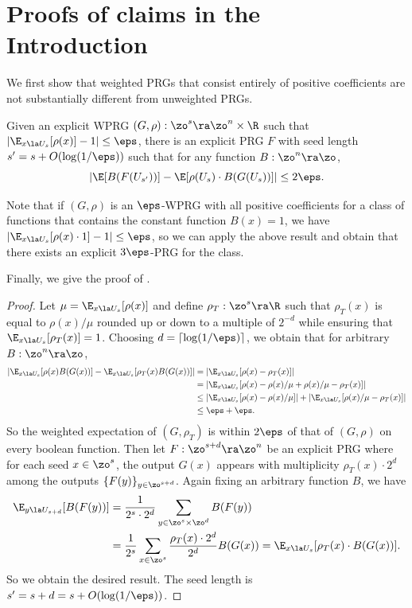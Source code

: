 \documentclass{toc}
\begin{document}
\section{Proofs of claims in the Introduction}\label{app:intro} %
We first show that weighted PRGs that consist entirely of positive coefficients are not substantially different %
from
%
unweighted PRGs.
\begin{proposition}\label{app:prop:unweight}
    Given an explicit WPRG $(G,\rho):\zo^s\ra\zo^n\times \R$
    such that $|\E_{x\la U_s}[\rho(x)]-1|\leq  \eps$, there is an explicit PRG $F$ with seed length $s'=s+O(\log(1/\eps))$ such that for any function $B:\zo^n\ra\zo$, \[|\E[B(F(U_{s'}))] - \E[\rho(U_s)\cdot B(G(U_s))] |\leq 2\eps.\]
\end{proposition}
Note that if $(G,\rho)$ is an $\eps$-WPRG with all positive coefficients for a class of functions that contains the constant function $B(x)=1$, we have $|\E_{x\la U_s}[\rho(x)\cdot 1]-1|\leq\eps$, so we can apply the above result and obtain that there exists an explicit $3\eps$-PRG for the class.

Finally, we give the proof of .
\begin{proof}
    Let $\mu=\E_{x\la U_s}[\rho(x)]$ and define $\rho_T:\zo^s\ra\R$ such that $\rho_T(x)$ is equal to $\rho(x)/\mu$ rounded up or down to a multiple of $2^{-d}$ while ensuring that $\E_{x\la U_s}[\rho_T(x)]=1$. Choosing $d=\lceil\log(1/\eps)\rceil$, we obtain that for arbitrary $B:\zo^n\ra\zo$,
    \begin{align*}
        \left|\E_{x\la U_s}[\rho(x)B(G(x))] -\E_{x\la U_s}[\rho_T(x)B(G(x))]\right|  &= \left|\E_{x\la U_s}[\rho(x) - \rho_T(x)]\right|\\
        &= \left|\E_{x\la U_s}[\rho(x) -\rho(x)/\mu+\rho(x)/\mu- \rho_T(x)] \right|\\
        &\leq \left|\E_{x\la U_s}[\rho(x) -\rho(x)/\mu]\right|+\left|\E_{x\la U_s}[\rho(x)/\mu- \rho_T(x)] \right|\\
        &\leq \eps+\eps.
    \end{align*}
    So the weighted expectation of $(G,\rho_T)$ is within $2\eps$ of that of $(G,\rho)$ on every boolean function. Then let $F:\zo^{s+d}\ra\zo^n$ be an explicit PRG where for each seed $x\in \zo^s$, the output $G(x)$ appears with multiplicity $\rho_T(x)\cdot 2^d$ among the outputs $\{F(y)\}_{y\in \zo^{s+d}}$. Again fixing an arbitrary function $B$, we have
%
%
\begin{align*}
 \E_{y\la U_{s+d}}[B(F(y))] &= \frac{1}{2^s\cdot 2^d}\sum_{y\in \zo^s\times\zo^d}B(F(y))\\
 &=\frac{1}{2^s}\sum_{x\in \zo^s}\frac{\rho_T(x)\cdot 2^d}{2^d}B(G(x))
        =\E_{x\la U_s}[\rho_T(x)\cdot B(G(x))].
\end{align*}
    So we obtain the desired result. The seed length is $s'=s+d=s+O(\log(1/\eps))$.
\end{proof}
\end{document}
